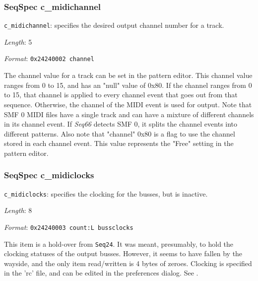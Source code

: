 \subsubsection{SeqSpec c\_midichannel}
\label{subsubsec:midi_format_track_seqspec_midichannel}


   \begin{description}
      \item \texttt{c\_midichannel}:
         specifies the desired output channel number for a track.
      \item \textsl{Length}: 5
      \item \textsl{Format}: \texttt{0x24240002 channel}
   \end{description}

   The channel value for a track can be set in the pattern editor.
   This channel value ranges from 0 to 15, and has an "null" value of 0x80.  If
   the channel ranges from 0 to 15, that channel is applied to every channel
   event that goes out from that sequence.  Otherwise, the channel of the MIDI
   event is used for output.  Note that SMF 0 MIDI files have a single track
   and can have a mixture of different channels in its channel event.
   If \textsl{Seq66} detects SMF 0, it splits the channel events into different
   patterns.
   Also note that "channel" 0x80 is a flag
   to use the channel stored in each channel event.
   This value represents the "Free" setting in the pattern editor.

\subsubsection{SeqSpec c\_midiclocks}
\label{subsubsec:midi_format_track_seqspec_midiclocks}


   \begin{description}
      \item \texttt{c\_midiclocks}: specifies the clocking for the busses,
         but is inactive.
      \item \textsl{Length}: 8
      \item \textsl{Format}: \texttt{0x24240003 count:L bussclocks}
   \end{description}

   This item is a hold-over from \texttt{Seq24}.  It was meant, presumably, to
   hold the clocking statuses of the output busses.  However, it seems to have
   fallen by the wayside, and the only item read/written is 4 bytes of zeroes.
   Clocking is specified in the 'rc' file, and can be edited in the preferences
   dialog.
   See .


